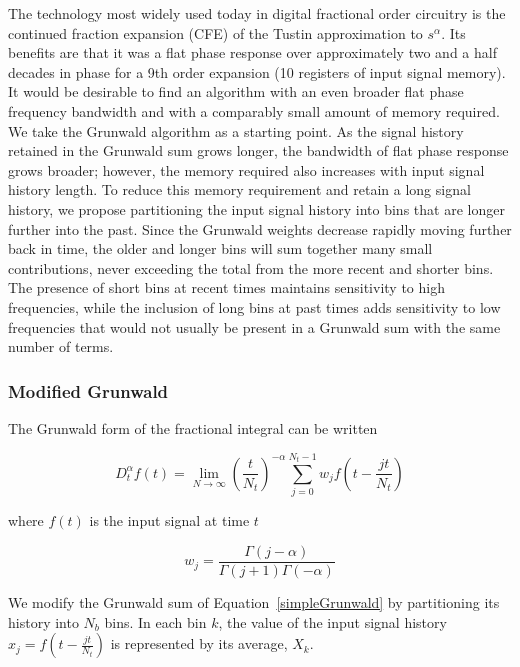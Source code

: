 The technology most widely used today in digital fractional order circuitry is the continued fraction expansion (CFE) of the Tustin approximation to $s^\alpha$. Its benefits are that it was a flat phase response over approximately two and a half decades in phase for a 9th order expansion (10 registers of input signal memory). It would be desirable to find an algorithm with an even broader flat phase frequency bandwidth and with a comparably small amount of memory required. We take the Grunwald algorithm as a starting point. As the signal history retained in the Grunwald sum grows longer, the bandwidth of flat phase response grows broader; however, the memory required also increases with input signal history length. To reduce this memory requirement and retain a long signal history, we propose partitioning the input signal history into bins that are longer further into the past. Since the Grunwald weights decrease rapidly moving further back in time, the older and longer bins will sum together many small contributions, never exceeding the total from the more recent and shorter bins. The presence of short bins at recent times maintains sensitivity to high frequencies, while the inclusion of long bins at past times adds sensitivity to low frequencies that would not usually be present in a Grunwald sum with the same number of terms. 


\subsubsection{Modified Grunwald}

The Grunwald form of the fractional integral can be written

\begin{equation}
D^\alpha_tf(t) = \displaystyle \lim_{N\to\infty} \left(\frac{t}{N_t}\right)^{-\alpha}
\displaystyle\sum\limits_{j=0}^{N_t-1} w_{j} f\left(t-\frac{j t}{N_t}\right)
\label{simpleGrunwald}
\end{equation}

\noindent where $f(t)$ is the input signal at time $t$

\begin{equation}
w_{j} = \frac{\Gamma(j-\alpha)}{\Gamma(j+1)\Gamma(-\alpha)}
\label{wj}
\end{equation}

\noindent We modify the Grunwald sum of Equation~\ref{simpleGrunwald} by partitioning its history into $N_b$ bins. In each bin $k$, the value of the input signal history $x_j=f\left(t-\frac{jt}{N_t}\right)$ is represented by its average, $X_k$.

